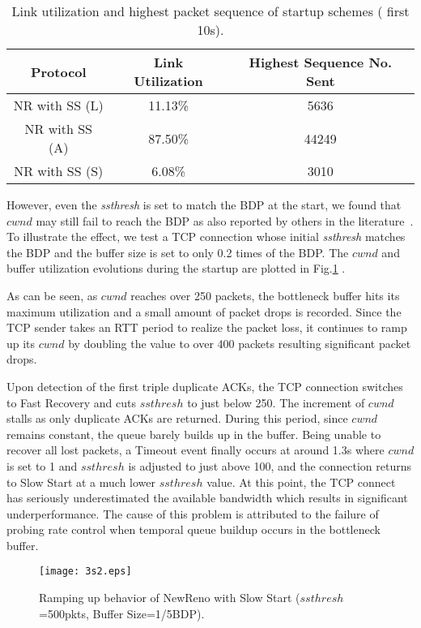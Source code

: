 \documentclass[12pt,onecolumn]{IEEEtran}
\begin{document}
\begin{table}
\centering
\caption{\footnotesize Link utilization and highest packet
sequence of startup schemes  ( first 10s).}
\begin{tabular}{|c|c|c|} \hline
Protocol& Link Utilization & Highest Sequence No. Sent\\ \hline \hline
NR with SS (L) & 11.13\%   &   5636\\ \hline NR with SS (A) & 87.50\%   & 44249 \\ \hline
NR with SS (S) & 6.08\%   &   3010\\ \hline
\end{tabular}
\label{table1}
\end{table}


However, even the \emph{ssthresh} is set to match the BDP at the start, we
found that $cwnd$ may still fail to reach the BDP as also reported by others in
the literature~\cite{short}. To illustrate the effect, we test a TCP connection
whose initial \emph{ssthresh} matches the BDP and the buffer size is set to
only 0.2 times of the BDP. The $cwnd$ and buffer utilization evolutions during
the startup are plotted in Fig.\ref{3s} .

As can be seen, as $cwnd$ reaches over 250 packets, the bottleneck buffer hits
its maximum utilization and a small amount of packet drops is recorded. Since
the TCP sender takes an RTT period to realize the packet loss, it continues to
ramp up its $cwnd$ by doubling the value to over 400 packets resulting
significant packet drops.

Upon detection of the first triple duplicate ACKs, the TCP connection switches
to Fast Recovery and cuts $ssthresh$ to just below 250. The increment of $cwnd$
stalls as only duplicate ACKs are returned. During this period, since $cwnd$
remains constant, the queue barely builds up in the buffer. Being unable to
recover all lost packets, a Timeout event finally occurs at around 1.3s where
$cwnd$ is set to 1 and $ssthresh$ is adjusted to just above 100, and the
connection returns to Slow Start at a much lower $ssthresh$ value. At this
point, the TCP connect has seriously underestimated the available bandwidth
which results in significant underperformance. The cause of this problem is
attributed to the failure of probing rate control when temporal queue buildup
occurs in the bottleneck buffer.

\begin{figure}
\centering
\texttt{[image: 3s2.eps]}
\caption{Ramping up behavior of NewReno with Slow Start ($ssthresh$=500pkts, Buffer Size=1/5BDP).} \label{3s}
\end{figure}
\end{document}
